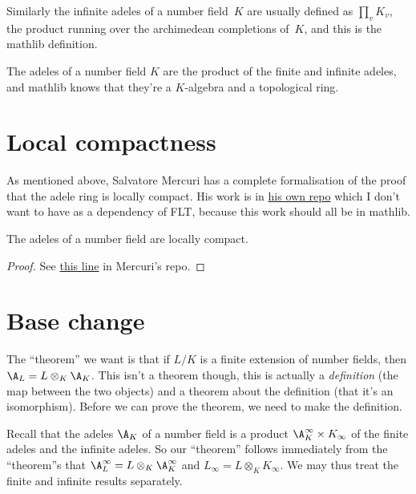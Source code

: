 Similarly the infinite adeles of a number field~$K$
are usually defined as $\prod_v K_v$,
the product running over the archimedean completions of~$K$, and this is
the mathlib definition.

The adeles of a number field $K$ are the product of the finite and infinite
adeles, and mathlib knows that they're a $K$-algebra and a topological ring.

\section{Local compactness}

As mentioned above, Salvatore Mercuri has a complete formalisation of the proof
that the adele ring is locally compact. His work is in
\href{https://github.com/smmercuri/adele-ring_locally-compact}{his own repo} which
I don't want to have as a dependency of FLT, because this work should all be
in mathlib.

\begin{theorem}
  \label{NumberField.AdeleRing.locallyCompactSpace}
  \leanok
  The adeles of a number field are locally compact.
\end{theorem}
\begin{proof}
  See \href{https://github.com/smmercuri/adele-ring_locally-compact/blob/e8e34608c139ee95a1e21d9d24f138524196a2e1/AdeleRingLocallyCompact/NumberTheory/NumberField/AdeleRing.lean#L70}
  {this line} in Mercuri's repo.
\end{proof}

\section{Base change}

The ``theorem'' we want is that if $L/K$ is a finite extension of number fields,
then $\A_L=L\otimes_K\A_K$. This isn't a theorem though, this is actually a \emph{definition}
(the map between the two objects) and a theorem about
the definition (that it's an isomorphism). Before we can prove the theorem, we need to make the
definition.

Recall that the adeles $\A_K$ of a number field is a product $\A_K^\infty\times K_\infty$
of the finite adeles and the infinite adeles. So our ``theorem'' follows immediately from
the ``theorem''s that $\A_L^\infty=L\otimes_K\A_K^\infty$ and $L_\infty=L\otimes_KK_\infty$.
We may thus treat the finite and infinite results separately.

